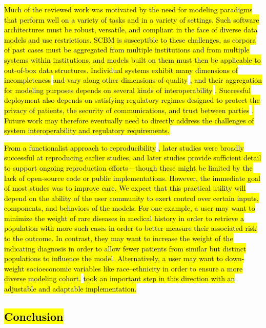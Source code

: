 \documentclass[sn-mathphys,Numbered,pdflatex]{sn-jnl}
\theoremstyle{remark}
\theoremstyle{definition}
\begin{document}
\hl{Much of the reviewed work was motivated by the need for modeling paradigms that perform well on a variety of tasks and in a variety of settings.
Such software architectures must be robust, versatile, and compliant in the face of diverse data models and use restrictions.
SCBM is susceptible to these challenges, as corpora of past cases must be aggregated from multiple institutions and from multiple systems within institutions, and models built on them must then be applicable to out-of-box data structures.
Individual systems exhibit many dimensions of incompleteness }\citep{Weiskopf2013}\hl{ and vary along other dimensions of quality }\citep{Kohane2021}\hl{, and their aggregation for modeling purposes depends on several kinds of interoperability }\citep{Weber2015}\hl{.
Successful deployment also depends on satisfying regulatory regimes designed to protect the privacy of patients, the security of communications, and trust between parties }\citep{Haendel2021}\hl{.
Future work may therefore eventually need to directly address the challenges of system interoperability and regulatory requirements.}

\hl{From a functionalist approach to reproducibility }\citep{Matarese2022}\hl{, later studies were broadly successful at reproducing earlier studies, and later studies provide sufficient detail to support ongoing reproduction efforts---though these might be limited by the lack of open-source code or public implementations.
However, the immediate goal of most studes was to improve care.
We expect that this practical utility will depend on the ability of the user community to exert control over certain inputs, components, and behaviors of the models.
For one example, a user may want to minimize the weight of rare diseases in medical history in order to retrieve a population with more such cases in order to better measure their associated risk to the outcome. In contrast, they may want to increase the weight of the indicating diagnosis in order to allow fewer patients from similar but distinct populations to influence the model. Alternatively, a user may want to down-weight socioeconomic variables like race--ethnicity in order to ensure a more diverse modeling cohort.
}\citet{Lopez2011}\hl{ took an important step in this direction with an adjustable and adaptable implementation.}

\subsection{\texorpdfstring{\hl{Conclusion}}{}}\label{section-1}
\end{document}
